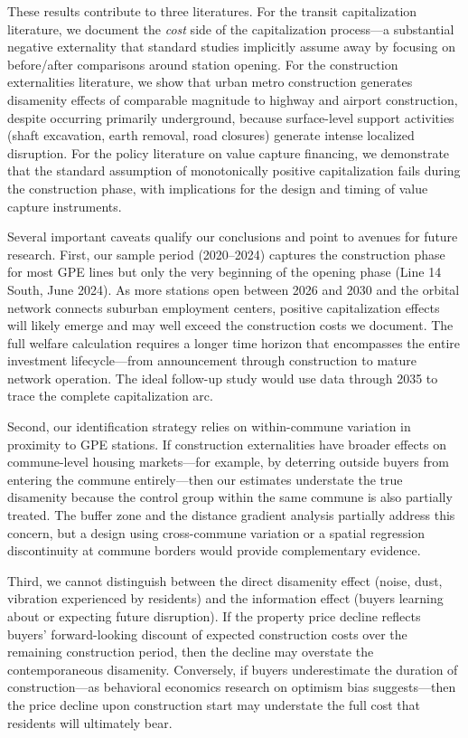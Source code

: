 \documentclass[12pt]{article}
\begin{document}
These results contribute to three literatures. For the transit capitalization literature, we document the \textit{cost} side of the capitalization process---a substantial negative externality that standard studies implicitly assume away by focusing on before/after comparisons around station opening. For the construction externalities literature, we show that urban metro construction generates disamenity effects of comparable magnitude to highway and airport construction, despite occurring primarily underground, because surface-level support activities (shaft excavation, earth removal, road closures) generate intense localized disruption. For the policy literature on value capture financing, we demonstrate that the standard assumption of monotonically positive capitalization fails during the construction phase, with implications for the design and timing of value capture instruments.

Several important caveats qualify our conclusions and point to avenues for future research. First, our sample period (2020--2024) captures the construction phase for most GPE lines but only the very beginning of the opening phase (Line 14 South, June 2024). As more stations open between 2026 and 2030 and the orbital network connects suburban employment centers, positive capitalization effects will likely emerge and may well exceed the construction costs we document. The full welfare calculation requires a longer time horizon that encompasses the entire investment lifecycle---from announcement through construction to mature network operation. The ideal follow-up study would use data through 2035 to trace the complete capitalization arc.

Second, our identification strategy relies on within-commune variation in proximity to GPE stations. If construction externalities have broader effects on commune-level housing markets---for example, by deterring outside buyers from entering the commune entirely---then our estimates understate the true disamenity because the control group within the same commune is also partially treated. The buffer zone and the distance gradient analysis partially address this concern, but a design using cross-commune variation or a spatial regression discontinuity at commune borders would provide complementary evidence.

Third, we cannot distinguish between the direct disamenity effect (noise, dust, vibration experienced by residents) and the information effect (buyers learning about or expecting future disruption). If the property price decline reflects buyers' forward-looking discount of expected construction costs over the remaining construction period, then the decline may overstate the contemporaneous disamenity. Conversely, if buyers underestimate the duration of construction---as behavioral economics research on optimism bias suggests---then the price decline upon construction start may understate the full cost that residents will ultimately bear.
\end{document}
